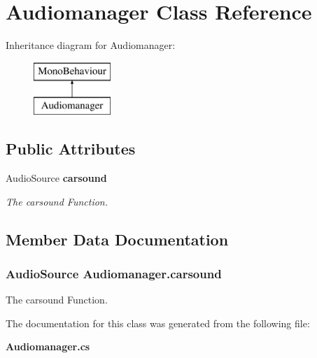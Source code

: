 \section{Audiomanager Class Reference}
\label{class_audiomanager}
Inheritance diagram for Audiomanager\+:\begin{figure}[H]
\begin{center}
\leavevmode
\includegraphics[height=2.000000cm]{class_audiomanager}
\end{center}
\end{figure}
\subsection*{Public Attributes}
\begin{DoxyCompactItemize}
\item 
Audio\+Source {\bf carsound}
\begin{DoxyCompactList}\small\item\em The carsound Function. \end{DoxyCompactList}\end{DoxyCompactItemize}


\subsection{Member Data Documentation}
\subsubsection[{carsound}]{\setlength{\rightskip}{0pt plus 5cm}Audio\+Source Audiomanager.\+carsound}\label{class_audiomanager_a6d2ca22b9b3d2d88489f168b1cfe179a}


The carsound Function. 



The documentation for this class was generated from the following file\+:\begin{DoxyCompactItemize}
\item 
{\bf Audiomanager.\+cs}\end{DoxyCompactItemize}
